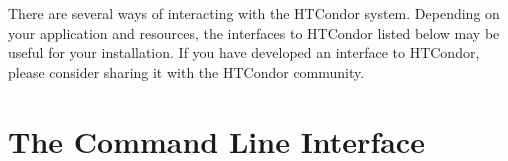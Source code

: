 There are several ways of interacting with the HTCondor system.  Depending on
your application and resources, the interfaces to HTCondor listed below may be
useful for your installation. If you have developed an interface to HTCondor,
please consider sharing it with the HTCondor community.






\section{\label{API-commandline} The Command Line Interface}
\Todo




